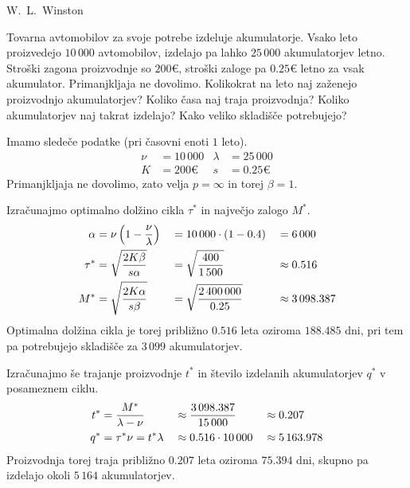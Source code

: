 \begin{naloga}{W.~L.~Winston}{\cite[\S15, Example~5]{w}}
\begin{vprasanje}
Tovarna avtomobilov za svoje potrebe izdeluje akumulatorje.
Vsako leto proizvedejo $10\,000$ avtomobilov,
izdelajo pa lahko $25\,000$ akumulatorjev letno.
Stroški zagona proizvodnje so $200 €$,
stroški zaloge pa $0.25 €$ letno za vsak akumulator.
Primanjkljaja ne dovolimo.
Kolikokrat na leto naj zaženejo proizvodnjo akumulatorjev?
Koliko časa naj traja proizvodnja?
Koliko akumulatorjev naj takrat izdelajo?
Kako veliko skladišče potrebujejo?
\end{vprasanje}

\begin{odgovor}
Imamo sledeče podatke (pri časovni enoti $1$ leto).
\begin{align*}
\nu &= 10\,000 &
\lambda &= 25\,000 \\
K &= 200 € &
s &= 0.25 €
\end{align*}
Primanjkljaja ne dovolimo, zato velja $p = \infty$ in torej $\beta = 1$.

Izračunajmo optimalno dolžino cikla $\tau^*$
in največjo zalogo $M^*$.
\begin{alignat*}{3}
\alpha &= \nu \left(1 - {\nu \over \lambda}\right)
&&= 10\,000 \cdot (1 - 0.4) &&= 6\,000 \\
\tau^* &= \sqrt{2K \beta \over s \alpha}
&&= \sqrt{400 \over 1\,500} &&\approx 0.516 \\
M^* &= \sqrt{2K \alpha \over s \beta}
&&= \sqrt{2\,400\,000 \over 0.25} &&\approx 3\,098.387
\end{alignat*}
Optimalna dolžina cikla je torej približno $0.516$ leta
oziroma $188.485$ dni,
pri tem pa potrebujejo skladišče za $3\,099$ akumulatorjev.

Izračunajmo še trajanje proizvodnje $t^*$
in število izdelanih akumulatorjev $q^*$ v posameznem ciklu.
\begin{alignat*}{3}
t^* &= {M^* \over \lambda - \nu}
&&\approx {3\,098.387 \over 15\,000} &&\approx 0.207 \\
q^* &= \tau^* \nu = t^* \lambda
&&\approx 0.516 \cdot 10\,000 &&\approx 5\,163.978
\end{alignat*}
Proizvodnja torej traja približno $0.207$ leta
oziroma $75.394$ dni,
skupno pa izdelajo okoli $5\,164$ akumulatorjev.
\end{odgovor}
\end{naloga}
